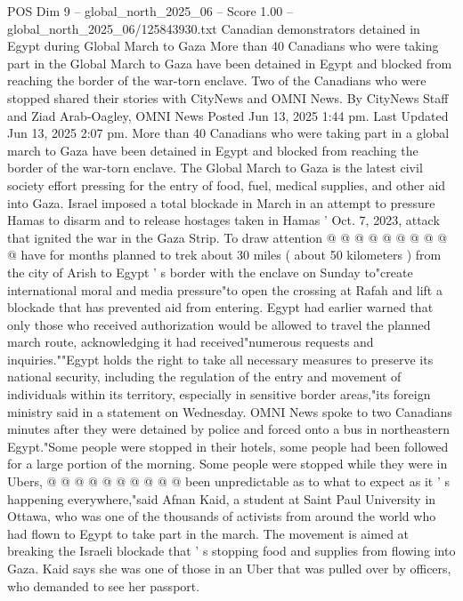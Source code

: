 \begin{textsample}{POS Dim 9 – global\_north\_2025\_06 – Score 1.00 – global\_north\_2025\_06/125843930.txt}  \label{ex:f9_pos_352}
Canadian demonstrators detained in Egypt during Global March to Gaza More than 40 Canadians who were taking part in the Global March to Gaza have been detained in Egypt and blocked from reaching the border of the war-torn enclave.
Two of the Canadians who were stopped shared their stories with CityNews and OMNI News.
By CityNews Staff and Ziad Arab-Oagley, OMNI News Posted Jun 13, 2025 1:44 pm.
Last Updated Jun 13, 2025 2:07 pm.
More than 40 Canadians who were taking part in a global march to Gaza have been detained in Egypt and blocked from reaching the border of the war-torn enclave.
The Global March to Gaza is the latest civil society effort pressing for the entry of food, fuel, medical supplies, and other aid into Gaza.
Israel imposed a total blockade in March in an attempt to pressure Hamas to disarm and to release hostages taken in Hamas ' Oct. 7, 2023, attack that ignited the war in the Gaza Strip.
To draw attention @ @ @ @ @ @ @ @ @ @ have for months planned to trek about 30 miles ( about 50 kilometers ) from the city of Arish to Egypt ' s border with the enclave on Sunday to"create international moral and media pressure"to open the crossing at Rafah and lift a blockade that has prevented aid from entering.
Egypt had earlier warned that only those who received authorization would be allowed to travel the planned march route, acknowledging it had received"numerous requests and inquiries.""Egypt holds the right to take all necessary measures to preserve its national security, including the regulation of the entry and movement of individuals within its territory, especially in sensitive border areas,"its foreign ministry said in a statement on Wednesday.
OMNI News spoke to two Canadians minutes after they were detained by police and forced onto a bus in northeastern Egypt."Some people were stopped in their hotels, some people had been followed for a large portion of the morning.
Some people were stopped while they were in Ubers, @ @ @ @ @ @ @ @ @ @ been unpredictable as to what to expect as it ' s happening everywhere,"said Afnan Kaid, a student at Saint Paul University in Ottawa, who was one of the thousands of activists from around the world who had flown to Egypt to take part in the march.
The movement is aimed at breaking the Israeli blockade that ' s stopping food and supplies from flowing into Gaza.
Kaid says she was one of those in an Uber that was pulled over by officers, who demanded to see her passport.

\end{textsample}
